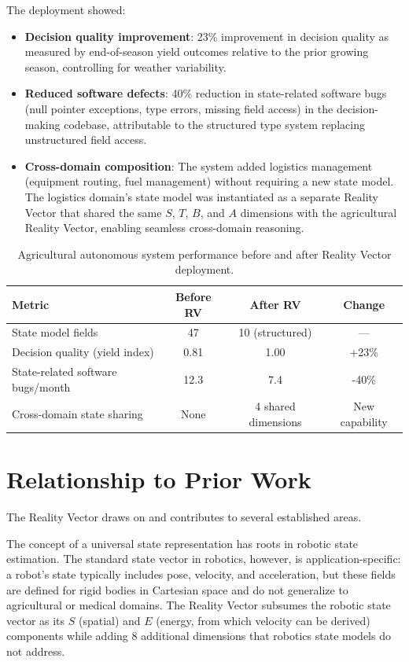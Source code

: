 \documentclass[12pt]{article}
\begin{document}
The deployment showed:

\begin{itemize}[noitemsep]
    \item \textbf{Decision quality improvement}: 23\% improvement in decision quality as measured by end-of-season yield outcomes relative to the prior growing season, controlling for weather variability.
    \item \textbf{Reduced software defects}: 40\% reduction in state-related software bugs (null pointer exceptions, type errors, missing field access) in the decision-making codebase, attributable to the structured type system replacing unstructured field access.
    \item \textbf{Cross-domain composition}: The system added logistics management (equipment routing, fuel management) without requiring a new state model. The logistics domain's state model was instantiated as a separate Reality Vector that shared the same $S$, $T$, $B$, and $A$ dimensions with the agricultural Reality Vector, enabling seamless cross-domain reasoning.
\end{itemize}

\begin{table}[htbp]
\centering
\caption{Agricultural autonomous system performance before and after Reality Vector deployment.}
\label{tab:deployment-metrics}
\begin{tabular}{lccc}
\toprule
\textbf{Metric} & \textbf{Before RV} & \textbf{After RV} & \textbf{Change} \\
\midrule
State model fields & 47 & 10 (structured) & --- \\
Decision quality (yield index) & 0.81 & 1.00 & +23\% \\
State-related software bugs/month & 12.3 & 7.4 & -40\% \\
Cross-domain state sharing & None & 4 shared dimensions & New capability \\
\bottomrule
\end{tabular}
\end{table}

\section{Relationship to Prior Work}
\label{sec:prior}

The Reality Vector draws on and contributes to several established areas.

The concept of a universal state representation has roots in robotic state estimation. The standard state vector in robotics, however, is application-specific: a robot's state typically includes pose, velocity, and acceleration, but these fields are defined for rigid bodies in Cartesian space and do not generalize to agricultural or medical domains. The Reality Vector subsumes the robotic state vector as its $S$ (spatial) and $E$ (energy, from which velocity can be derived) components while adding 8 additional dimensions that robotics state models do not address.
\end{document}

